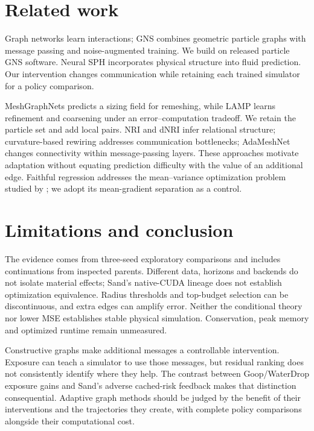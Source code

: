 \section{Related work}
Graph networks learn interactions\citep{battaglia2016}; GNS combines geometric particle graphs with message passing and noise-augmented training\citep{sanchez2020}. We build on released particle GNS software\citep{kumar2023}. Neural SPH incorporates physical structure into fluid prediction\citep{toshev2024}. Our intervention changes communication while retaining each trained simulator for a policy comparison.

MeshGraphNets predicts a sizing field for remeshing\citep{pfaff2021}, while LAMP learns refinement and coarsening under an error--computation tradeoff\citep{wu2023}. We retain the particle set and add local pairs. NRI and dNRI infer relational structure\citep{kipf2018,graber2020}; curvature-based rewiring addresses communication bottlenecks\citep{topping2022}; AdaMeshNet changes connectivity within message-passing layers\citep{seo2025}. These approaches motivate adaptation without equating prediction difficulty with the value of an additional edge. Faithful regression\citep{stirn2023} addresses the mean--variance optimization problem studied by \citet{seitzer2022}; we adopt its mean-gradient separation as a control.

\section{Limitations and conclusion}
The evidence comes from three-seed exploratory comparisons and includes continuations from inspected parents. Different data, horizons and backends do not isolate material effects; Sand's native-CUDA lineage does not establish optimization equivalence. Radius thresholds and top-budget selection can be discontinuous, and extra edges can amplify error. Neither the conditional theory nor lower MSE establishes stable physical simulation. Conservation, peak memory and optimized runtime remain unmeasured.

Constructive graphs make additional messages a controllable intervention. Exposure can teach a simulator to use those messages, but residual ranking does not consistently identify where they help. The contrast between Goop/WaterDrop exposure gains and Sand's adverse cached-risk feedback makes that distinction consequential. Adaptive graph methods should be judged by the benefit of their interventions and the trajectories they create, with complete policy comparisons alongside their computational cost.
